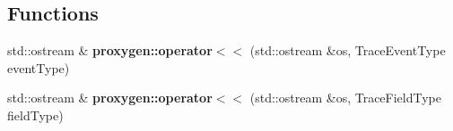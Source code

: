 \subsection*{Functions}
\begin{DoxyCompactItemize}
\item 
std\+::ostream \& {\bf proxygen\+::operator$<$$<$} (std\+::ostream \&os, Trace\+Event\+Type event\+Type)
\item 
std\+::ostream \& {\bf proxygen\+::operator$<$$<$} (std\+::ostream \&os, Trace\+Field\+Type field\+Type)
\end{DoxyCompactItemize}
